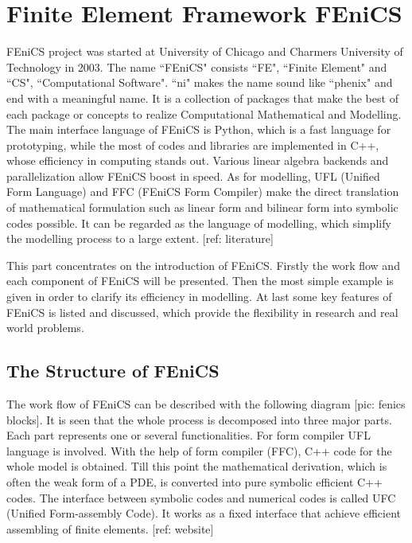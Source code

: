 %
%
%
%
%
%

\chapter{Finite Element Framework FEniCS}

FEniCS project was started at University of Chicago and Charmers University of Technology in 2003. The name ``FEniCS" consists ``FE", ``Finite Element" and ``CS", ``Computational Software". ``ni" makes the name sound like ``phenix" and end with a meaningful name. It is a collection of packages that make the best of each package or concepts to realize Computational Mathematical and Modelling. The main interface language of FEniCS is Python, which is a fast language for prototyping, while the most of codes and libraries are implemented in C++, whose efficiency in computing stands out. Various linear algebra backends and parallelization allow FEniCS boost in speed. As for modelling, UFL (Unified Form Language) and FFC (FEniCS Form Compiler) make the direct translation of mathematical formulation such as linear form and bilinear form into symbolic codes possible. It can be regarded as the language of modelling, which simplify the modelling process to a large extent. [ref: literature]

This part concentrates on the introduction of FEniCS. Firstly the work flow and each component of FEniCS will be presented. Then the most simple example is given in order to clarify its efficiency in modelling. At last some key features of FEniCS is listed and discussed, which provide the flexibility in research and real world problems.

\section{The Structure of FEniCS}
The work flow of FEniCS can be described with the following diagram [pic: fenics blocks]. It is seen that the whole process is decomposed into three major parts. Each part represents one or several functionalities. For form compiler UFL language is involved. With the help of form compiler (FFC), C++ code for the whole model is obtained. Till this point the mathematical derivation, which is often the weak form of a PDE, is converted into pure symbolic efficient C++ codes. The interface between symbolic codes and numerical codes is called UFC (Unified Form-assembly Code). It works as a fixed interface that achieve efficient assembling of finite elements. [ref: website]

